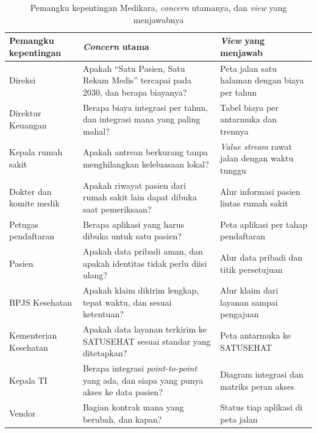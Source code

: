 \begin{table}[!htb]
  \centering
  \caption{Pemangku kepentingan Medikara, \textit{concern} utamanya, dan
           \textit{view} yang menjawabnya}
  \label{tab:ch02-concern-medikara}
  {\footnotesize
  \begin{tabularx}{\textwidth}{>{\raggedright\arraybackslash}p{2.3cm}
                               >{\raggedright\arraybackslash}X
                               >{\raggedright\arraybackslash}p{3.7cm}}
    \hline
    \textbf{Pemangku kepentingan} & \textbf{\textit{Concern} utama} & \textbf{\textit{View} yang menjawab} \\
    \hline
    Direksi & Apakah ``Satu Pasien, Satu Rekam Medis'' tercapai pada 2030, dan berapa biayanya? & Peta jalan satu halaman dengan biaya per tahun \\
    \hline
    Direktur Keuangan & Berapa biaya integrasi per tahun, dan integrasi mana yang paling mahal? & Tabel biaya per antarmuka dan trennya \\
    \hline
    Kepala rumah sakit & Apakah antrean berkurang tanpa menghilangkan keleluasaan lokal? & \textit{Value stream} rawat jalan dengan waktu tunggu \\
    \hline
    Dokter dan komite medik & Apakah riwayat pasien dari rumah sakit lain dapat dibuka saat pemeriksaan? & Alur informasi pasien lintas rumah sakit \\
    \hline
    Petugas pendaftaran & Berapa aplikasi yang harus dibuka untuk satu pasien? & Peta aplikasi per tahap pendaftaran \\
    \hline
    Pasien & Apakah data pribadi aman, dan apakah identitas tidak perlu diisi ulang? & Alur data pribadi dan titik persetujuan \\
    \hline
    BPJS Kesehatan & Apakah klaim dikirim lengkap, tepat waktu, dan sesuai ketentuan? & Alur klaim dari layanan sampai pengajuan \\
    \hline
    Kementerian Kesehatan & Apakah data layanan terkirim ke SATUSEHAT sesuai standar yang ditetapkan? & Peta antarmuka ke SATUSEHAT \\
    \hline
    Kepala TI & Berapa integrasi \textit{point-to-point} yang ada, dan siapa yang punya akses ke data pasien? & Diagram integrasi dan matriks peran akses \\
    \hline
    Vendor & Bagian kontrak mana yang berubah, dan kapan? & Status tiap aplikasi di peta jalan \\
    \hline
  \end{tabularx}}
\end{table}


